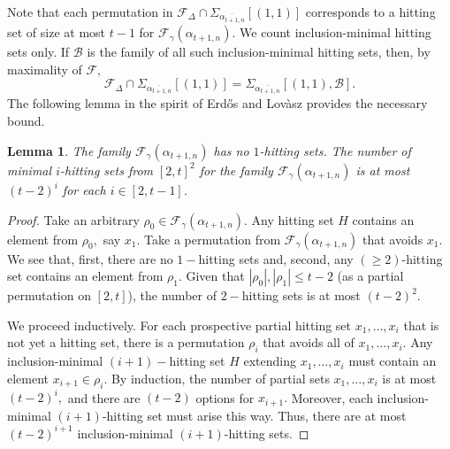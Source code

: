 \documentclass[11pt]{extarticle}
\numberwithin{equation}{section} %
\theoremstyle{plain}
\newtheorem{lem}[thm]{Lemma}
\theoremstyle{definition}
\newcommand{\FF}{\mathcal{F}}
\newcommand{\ff}{\mathcal{F}}
\newcommand{\m}{\mathcal}
\begin{document}
Note that each permutation in  $\FF_\Delta \cap \Sigma_{ \overline{\alpha_{t+1,n}}}[(1, 1)]$ corresponds to a hitting set of size at most $t-1$ for $\FF_\gamma(\alpha_{t+1, n})$. We count inclusion-minimal hitting sets only. If $\m B$ is the  family of all such inclusion-minimal hitting sets, then, by maximality of $\ff,$
$$\FF_\Delta\cap \Sigma_{ \overline{\alpha_{t+1,n}}}[(1, 1)]= \Sigma_{ \overline{\alpha_{t+1,n}}}[(1,1), \m B].$$
The following lemma in the spirit of Erd\H os and Lov\`asz provides the necessary bound.  
\begin{lem} \label{hitsets}
    The family  $\FF_{\gamma}(\alpha_{t+1,n})$ has no $1$-hitting sets. The number of minimal $i$-hitting sets from $[2,t]^2$  for the family $\FF_{\gamma}(\alpha_{t+1,n})$ is at most $(t-2)^i$ for each $i \in[2,t-1]$.
\end{lem}
\begin{proof}
    Take  an arbitrary $\rho_0\in \FF_\gamma(\alpha_{t+1, n})$. Any hitting set $H$ contains an element from $\rho_0, $ say $x_1$. Take a permutation from $\FF_\gamma(\alpha_{t+1, n})$ that avoids $x_1$. We see that, first, there are no $1-$hitting sets and, second, any $(\ge 2)$-hitting set contains an element from $\rho_1$.  Given that $|\rho_0|,|\rho_1| \leq t-2$ (as a partial permutation on $[2,t]$),  the number of $2-$hitting sets is at most $(t-2)^2$. 
    
    We proceed inductively. For each prospective partial hitting set $x_1,\ldots, x_i$ that is not yet a hitting set, there is a permutation $\rho_i$ that avoids all of $x_1,\ldots, x_i$.  Any inclusion-minimal $(i+1)-$hitting set $H$ extending $x_1,\ldots, x_i$ must contain an element $x_{i+1} \in \rho_i$. By induction, the number of partial sets $x_1,\ldots, x_i$ is at most $(t-2)^i,$ and there are $(t-2)$ options for $x_{i+1}.$ Moreover, each inclusion-minimal $(i+1)$-hitting set must arise this way. Thus, there are at most $(t-2)^{i+1}$ inclusion-minimal $(i+1)$-hitting sets. 
\end{proof}
\end{document}

